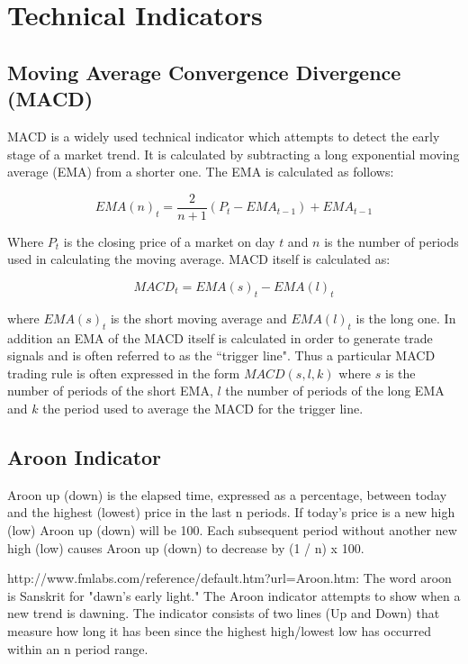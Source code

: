 
\chapter{Technical Indicators} %

\label{AppendixB} %



\section{Moving Average Convergence Divergence (MACD)}
\label{appB:MACD}
MACD is a widely used technical indicator which attempts to detect the early stage of a market trend. It is calculated by subtracting a long exponential moving average (EMA) from a shorter one. The EMA is calculated as follows:

\[ EMA(n)_{t} = \dfrac{2}{n+1}(P_{t}-EMA_{t-1}) + EMA_{t-1}\]

Where $ P_{t} $ is the closing price of a market on day $ t $ and $ n $ is the number of periods used in calculating the moving average. MACD itself is calculated as:

\[ MACD_{t} = EMA(s)_{t} - EMA(l)_{t} \]

where $ EMA(s)_{t} $ is the short moving average and $ EMA(l)_{t} $ is the long one. In addition an EMA of the MACD itself is calculated in order to generate trade signals and is often referred to as the \textquotedblleft trigger line". Thus a particular MACD trading rule is often expressed in the form $ MACD(s,l,k) $ where $ s $ is the number of periods of the short EMA, $ l $ the number of periods of the long EMA and $ k $ the period used to average the MACD for the trigger line.

\section{Aroon Indicator}
\label{appB:aroon}
Aroon up (down) is the elapsed time, expressed as a percentage, between today and the highest (lowest) price in the last n periods. If today’s price is a new high (low) Aroon up (down) will be 100. Each subsequent period without another new high (low) causes Aroon up (down) to decrease by (1 / n) x 100.

http://www.fmlabs.com/reference/default.htm?url=Aroon.htm:
The word aroon is Sanskrit for "dawn's early light." The Aroon indicator attempts to show when a new trend is dawning. The indicator consists of two lines (Up and Down) that measure how long it has been since the highest high/lowest low has occurred within an n period range.

